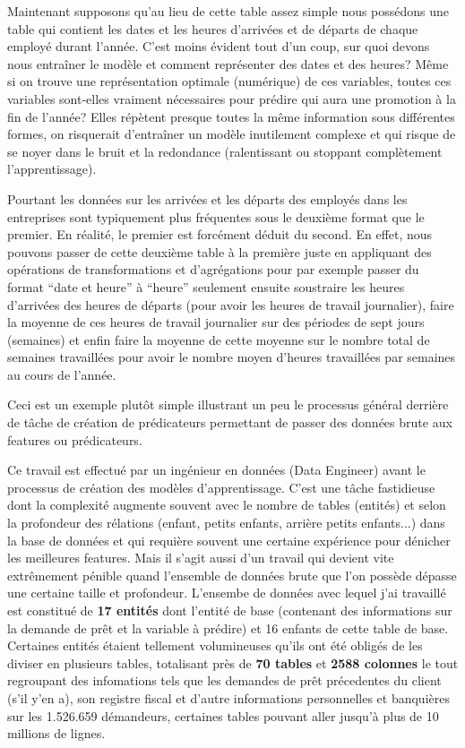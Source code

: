 Maintenant supposons qu’au lieu de cette table assez simple nous possédons une table qui
contient les dates et les heures d’arrivées et de départs de chaque employé durant l’année.
C’est moins évident tout d’un coup, sur quoi devons nous entraîner le modèle et comment
représenter des dates et des heures? Même si on trouve une représentation optimale
(numérique) de ces variables, toutes ces variables sont-elles vraiment nécessaires pour
prédire qui aura une promotion à la fin de l’année? Elles répètent presque toutes la même
information sous différentes formes, on risquerait d’entraîner un modèle inutilement complexe et qui risque de se noyer dans le bruit et la redondance (ralentissant ou stoppant complètement l’apprentissage).

Pourtant les données sur les arrivées et les départs des employés dans les entreprises sont
typiquement plus fréquentes sous le deuxième format que le premier. En réalité, le
premier est forcément déduit du second. En effet, nous pouvons passer de cette deuxième table à la première juste en appliquant des opérations de transformations et d'agrégations pour par exemple passer du format “date et heure” à “heure” seulement ensuite soustraire les heures d'arrivées des heures de départs (pour avoir les heures de travail journalier), faire la moyenne de ces heures de travail journalier sur des périodes de sept jours (semaines) et enfin faire la moyenne de cette moyenne sur le nombre total de semaines travaillées pour avoir le nombre moyen d’heures travaillées par semaines au cours de l’année.

Ceci est un exemple plutôt simple illustrant un peu le processus général derrière de tâche
de création de prédicateurs permettant de passer des données brute aux features ou prédicateurs.

Ce travail est effectué par un ingénieur en données (Data Engineer) avant le processus de
création des modèles d’apprentissage. C’est une tâche fastidieuse dont la complexité
augmente souvent avec le nombre de tables (entités) et selon la profondeur des rélations (enfant, petits enfants, arrière petits enfants...) dans la base de données et qui requière
souvent une certaine expérience pour dénicher les meilleures features. Mais il s'agit aussi d'un travail qui devient vite extrêmement pénible quand l'ensemble de données brute que l'on possède dépasse une certaine taille et profondeur. L'ensembe de données avec lequel j'ai travaillé est constitué de \textbf{17 entités} dont l'entité de base (contenant des informations sur la demande de prêt et la variable à prédire) et 16 enfants de cette table de base. Certaines entités étaient tellement volumineuses qu'ils ont été obligés de les diviser en plusieurs tables, totalisant près de \textbf{70 tables} et \textbf{2588 colonnes} le tout regroupant des infomations tels que les demandes de prêt précedentes du client (s'il y'en a), son registre fiscal et d'autre informations personnelles et banquières sur les 1.526.659 démandeurs, certaines tables pouvant aller jusqu'à plus de 10 millions de lignes.

